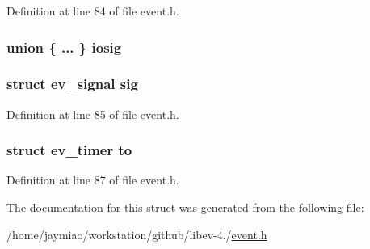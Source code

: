 \-Definition at line 84 of file event.\-h.

\hypertarget{structevent_a3fbb6fe0300dadbfebf8d1516f74082d}{
\subsubsection[{iosig}]{\setlength{\rightskip}{0pt plus 5cm}union \{ ... \}   {\bf iosig}}}\label{structevent_a3fbb6fe0300dadbfebf8d1516f74082d}
\hypertarget{structevent_ad3d5a2f9ab72029d05b260267e08eba1}{
\subsubsection[{sig}]{\setlength{\rightskip}{0pt plus 5cm}struct {\bf ev\-\_\-signal} {\bf sig}}}\label{structevent_ad3d5a2f9ab72029d05b260267e08eba1}


\-Definition at line 85 of file event.\-h.

\hypertarget{structevent_aba52a2d8ebe3e4d2e9bac349f661d509}{
\subsubsection[{to}]{\setlength{\rightskip}{0pt plus 5cm}struct {\bf ev\-\_\-timer} {\bf to}}}\label{structevent_aba52a2d8ebe3e4d2e9bac349f661d509}


\-Definition at line 87 of file event.\-h.



\-The documentation for this struct was generated from the following file\-:\begin{DoxyCompactItemize}
\item 
/home/jaymiao/workstation/github/libev-\/4./\hyperlink{event_8h}{event.\-h}\end{DoxyCompactItemize}
